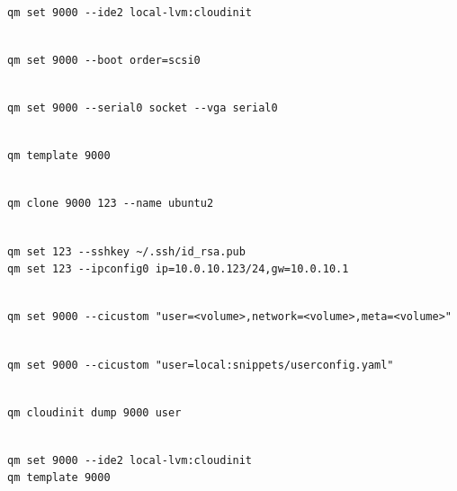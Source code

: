 \begin{lstlisting}

qm set 9000 --ide2 local-lvm:cloudinit

\end{lstlisting}

\begin{lstlisting}

qm set 9000 --boot order=scsi0

\end{lstlisting}

\begin{lstlisting}

qm set 9000 --serial0 socket --vga serial0

\end{lstlisting}

\begin{lstlisting}

qm template 9000

\end{lstlisting}

\begin{lstlisting}

qm clone 9000 123 --name ubuntu2

\end{lstlisting}

\begin{lstlisting}

qm set 123 --sshkey ~/.ssh/id_rsa.pub
qm set 123 --ipconfig0 ip=10.0.10.123/24,gw=10.0.10.1

\end{lstlisting}

\begin{lstlisting}

qm set 9000 --cicustom "user=<volume>,network=<volume>,meta=<volume>"

\end{lstlisting}

\begin{lstlisting}

qm set 9000 --cicustom "user=local:snippets/userconfig.yaml"

\end{lstlisting}

\begin{lstlisting}

qm cloudinit dump 9000 user

\end{lstlisting}

\begin{lstlisting}

qm set 9000 --ide2 local-lvm:cloudinit
qm template 9000

\end{lstlisting}

